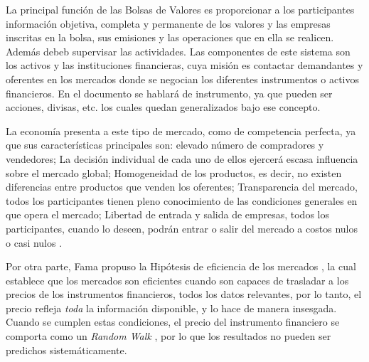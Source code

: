 La principal función de las Bolsas de Valores es proporcionar a los participantes información objetiva, completa y permanente de los valores
y las empresas inscritas en la bolsa, sus emisiones y las operaciones que en ella se realicen. Además debeb supervisar las actividades. Las componentes de este 
sistema son los activos y las instituciones financieras, cuya misión es contactar demandantes y oferentes en los mercados donde se negocian los diferentes instrumentos 
o activos financieros. En el documento se hablará de instrumento, ya que pueden ser acciones, divisas, etc. los cuales quedan generalizados bajo ese concepto.

La economía presenta a este tipo de mercado, como de competencia perfecta, ya que sus características principales son:
elevado número de compradores y vendedores; La decisión individual de cada uno de ellos ejercerá escasa influencia sobre el mercado global; 
Homogeneidad de los productos, es decir, no existen diferencias entre productos que venden los oferentes; Transparencia del mercado, todos los 
participantes tienen pleno conocimiento de las condiciones generales en que opera el mercado; Libertad de entrada y salida de empresas, todos 
los participantes, cuando lo deseen, podrán entrar o salir del mercado a costos nulos o casi nulos \cite{mankiw2011principles}. 

Por otra parte, Fama propuso la Hipótesis de eficiencia de los mercados \cite{malkiel2012efficient}, la cual establece que los mercados son eficientes cuando
son capaces de trasladar a los precios de los instrumentos financieros, todos los datos relevantes, por lo tanto, el precio refleja \emph{toda} la 
información disponible, y lo hace de manera insesgada. Cuando se cumplen estas condiciones, el precio del instrumento financiero se comporta como un 
\emph{Random Walk} \cite{fama1965random}, por lo que los resultados no pueden ser predichos sistemáticamente.



